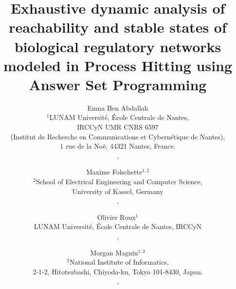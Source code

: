 \documentclass{tlp}
\begin{document}


\long{}


\title[Exhaustive analysis of biological regulatory networks using ASP]{Exhaustive dynamic analysis of reachability and stable states
of biological regulatory networks modeled in Process Hitting
using Answer Set Programming}


\author[E. Ben Abdallah, M. Folschette, O. Roux, M. Magnin]
{Emna Ben Abdallah\\
$^1$LUNAM Université, \'Ecole Centrale de Nantes, \\
 IRCCyN UMR CNRS 6597\\ (Institut de Recherche en Communications et Cybern\'etique de Nantes),\\
  1 rue de la Noë, 44321 Nantes, France.\\
,\\
\and Maxime Folschette$^{1,2}$\\
$^2$School of Electrical Engineering and Computer Science,\\
University of Kassel, Germany \\
,\\
\and
Olivier Roux$^1$ \\
LUNAM Université, \'Ecole Centrale de Nantes, IRCCyN \\
,\\
\and Morgan Magnin$^{1,3}$ \\
$^3$National Institute of Informatics, \\
2-1-2, Hitotsubashi, Chiyoda-ku, Tokyo 101-8430, Japan.\\
,\\
}
\pagerange{\pageref{firstpage}--\pageref{lastpage}}
\setcounter{page}{1}

\maketitle
\end{document}
